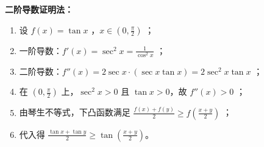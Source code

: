 \begin{proofbox}
\textbf{二阶导数证明法：}
\begin{enumerate}
    \item 设 $f(x) = \tan x$ ，$x \in (0, \frac{\pi}{2})$ ；
    \item 一阶导数：$f'(x) = \sec^2 x = \frac{1}{\cos^2 x}$ ；
    \item 二阶导数：$f''(x) = 2\sec x \cdot (\sec x \tan x) = 2\sec^2 x \tan x$ ；
    \item 在 $(0, \frac{\pi}{2})$ 上，$\sec^2 x > 0$ 且 $\tan x > 0$，故 $f''(x) > 0$ ；
    \item 由琴生不等式，下凸函数满足 $\frac{f(x)+f(y)}{2} \geqslant f(\frac{x+y}{2})$ ；
    \item 代入得 $\frac{\tan x + \tan y}{2} \geqslant \tan(\frac{x+y}{2})$。
\end{enumerate}
\end{proofbox}